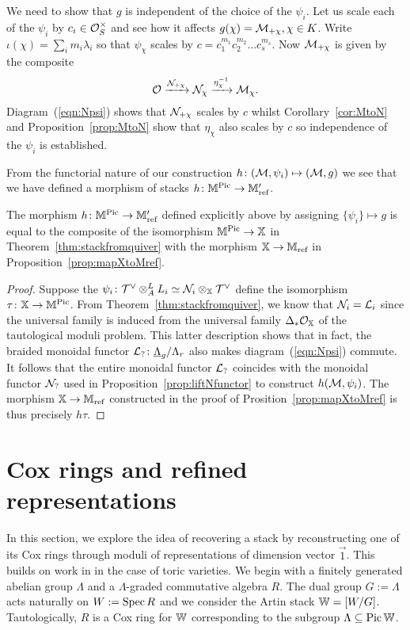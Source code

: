 \documentclass[12pt]{amsart}
\begin{document}
We need to show that $g$ is independent of the choice of the $\psi_i$. Let us scale each of the $\psi_i$ by $c_i \in \mathcal{O}_S^{\times}$ and see how it affects $g(\chi) = \mathcal{M}_{+\chi}, \chi \in K$. Write $\iota(\chi) = \sum_i m_i \lambda_i$ so that $\psi_{\chi}$ scales by $c = c_1^{m_1} c_2^{m_2} \ldots c_s^{m_s}$. Now $\mathcal{M}_{+\chi}$ is given by the composite
$$ \mathcal{O} \xrightarrow{\mathcal{N}_{+\chi}} \mathcal{N}_{\chi} \xrightarrow{\eta^{-1}_{\chi}} \mathcal{M}_{\chi}.$$
Diagram~(\ref{eqn:Npsi}) shows that $\mathcal{N}_{+\chi}$ scales by $c$ whilst Corollary~\ref{cor:MtoN} and Proposition~\ref{prop:MtoN} show that $\eta_{\chi}$ also scales by $c$ so independence of the $\psi_i$ is established. 

From the functorial nature of our construction $h \colon  (\mathcal{M},\psi_i) \mapsto (\mathcal{M},g)$ we see that we have defined a morphism of stacks $h\colon \mathbb{M}^{\operatorname{Pic}} \to \mathbb{M}'_{\text{ref}}$. 

\begin{theorem}
The morphism $h\colon\mathbb{M}^{\operatorname{Pic}} \to \mathbb{M}'_{\text{ref}}$ defined explicitly above by assigning $\{\psi_i\} \mapsto g$ is equal to the composite of the isomorphism $\mathbb{M}^{\operatorname{Pic}} \to \mathbb{X}$ in Theorem~\ref{thm:stackfromquiver} with the morphism $\mathbb{X} \to \mathbb{M}_{\text{ref}}$ in Proposition~\ref{prop:mapXtoMref}.
\end{theorem}
\begin{proof}
Suppose the $\psi_i \colon \mathcal{T}^{\vee} \otimes_A^L L_i \simeq \mathcal{N}_i \otimes_{\mathbb{X}} \mathcal{T}^{\vee}$ define the isomorphism $\tau \colon \mathbb{X} \to \mathbb{M}^{\operatorname{Pic}}$. From Theorem~\ref{thm:stackfromquiver}, we know that $\mathcal{N}_i = \mathcal{L}_i$ since the universal family is induced from the universal family $\Delta_* \mathcal{O}_{\mathbb{X}}$ of the tautological moduli problem. This latter description shows that in fact, the braided monoidal functor $\mathcal{L}_? \colon \underline{\Lambda}_g/\Lambda_r$ also makes diagram~(\ref{eqn:Npsi}) commute. It follows that the entire monoidal functor $\mathcal{L}_?$ coincides with the monoidal functor $\mathcal{N}_?$ used in Proposition~\ref{prop:liftNfunctor} to construct $h(\mathcal{M},\psi_i)$. The morphism $\mathbb{X} \to \mathbb{M}_{\text{ref}}$ constructed in the proof of Prosition~\ref{prop:mapXtoMref} is thus precisely $h\tau$. 
\end{proof}

\section{Cox rings and refined representations} \label{sec:refinedviaCox}

In this section, we explore the idea of recovering a stack by reconstructing one of its Cox rings through moduli of representations of dimension vector $\vec{1}$. This builds on work in \cite{Abd} in the case of toric varieties. We begin with a finitely generated abelian group $\Lambda$ and a $\Lambda$-graded commutative algebra $R$. The dual group $G:= \Lambda$ acts naturally on $W:=\operatorname{Spec} R$ and we consider the Artin stack $\mathbb{W} = [W/ G]$. Tautologically, $R$ is a Cox ring for $\mathbb{W}$ corresponding to the subgroup $\Lambda \subseteq \operatorname{Pic} \mathbb{W}$.
\end{document}

